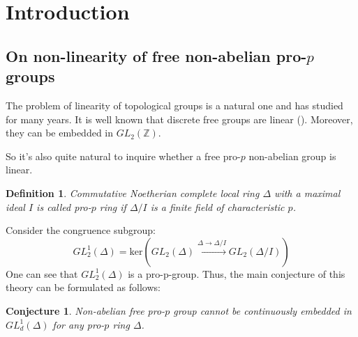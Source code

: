 \documentclass[12pt,a4paper]{article}
\newtheorem*{conjecture*}{Conjecture}
\newtheorem{definition}{Definition}[subsection]
\begin{document}
    \begin{abstract}
        Let $F$ be a free pro-$p$ non-abelian group, and let $\Delta$ represent a commutative Noetherian complete local ring with maximal ideal $I$ such that
        $\mathrm{char}(\Delta/I)=p$.\\
        We define the group
        \[GL_2^1(\Delta) = \mathrm{ker}\left( GL_2(\Delta) \xrightarrow{\Delta\to\Delta/I} GL_2(\Delta/I) \right)\]
        A.N.\ Zubkov proved that $F$ cannot be continuously embedded in $GL_2^1(\Delta)$ for $p\neq 2$.\\
        D.\ Ben-Ezra and E.\ Zelmanov further established that this embedding is not possible for $p = 2$ and $\mathrm{char}(\Delta) = 2$.\\
        In this paper we aim to extend this result for $\mathrm{char}(\Delta)=4$.\\
        In the second part we will investigate the connection between PI-theory and the old-standing Gelfand conjecture.
    \end{abstract}


    \section{Introduction}

    \subsection{On non-linearity of free non-abelian pro-$p$ groups}
    The problem of linearity of topological groups is a natural one and has studied for many years.
    It is well known that discrete free groups are linear (\cite{Sanov}).
    Moreover, they can be embedded in $GL_2(\mathbb{Z})$.

    So it's also quite natural to inquire whether a free pro-$p$ non-abelian group is linear.

    \vskip 0.1in\noindent
    \begin{definition}
        Commutative Noetherian complete local ring $\Delta$ with a maximal ideal $I$ is called pro-$p$ ring if $\Delta/I$ is a finite field of characteristic $p$.
    \end{definition}
    \vskip 0.1in\noindent

    Consider the congruence subgroup:
    \[GL_2^1(\Delta) = \mathrm{ker}\left( GL_2(\Delta) \xrightarrow{\Delta\to\Delta/I} GL_2(\Delta/I) \right)\]
    One can see that $GL_2^1(\Delta)$ is a pro-p-group.
    Thus, the main conjecture of this theory can be formulated as follows:
    \vskip 0.1in\noindent
    \begin{conjecture*}
        Non-abelian free pro-$p$ group cannot be continuously embedded in $GL_d^1(\Delta)$ for any pro-$p$ ring $\Delta$.
    \end{conjecture*}
    \vskip 0.1in\noindent
\end{document}
